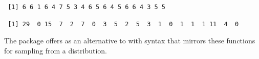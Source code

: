 \begin{knitrout}
{\begin{kframe}
\begin{flushleft}
\normalfont
\end{flushleft}
\begin{verbatim}
 [1] 6 6 1 6 4 7 5 3 4 6 5 6 4 5 6 6 4 3 5 5
\end{verbatim}
\begin{flushleft}
\ttfamily\noindent
{}\hlkeyword{(}\hlkeyword{,}{\ }\hlkeyword{)}{\ }{\ }\mbox{}
\normalfont
\end{flushleft}
\begin{verbatim}
 [1] 29  0 15  7  2  7  0  3  5  2  5  3  1  0  1  1  1 11  4  0
\end{verbatim}
\end{kframe}}
\end{knitrout}


The  package offers  as an alternative to 
 with syntax that mirrors these functions for sampling from
a distribution.

\begin{knitrout}
\end{knitrout}


\begin{knitrout}
\end{knitrout}

